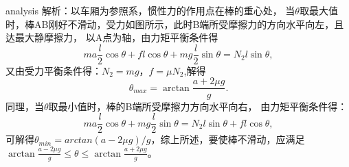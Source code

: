 \begin{example}
	
	\begin{taggedblock}{analysis}
		解析：以车厢为参照系，惯性力的作用点在棒的重心处，
		当$ \theta $取最大值时，棒AB刚好不滑动，受力如图所示，此时B端所受摩擦力的方向水平向左，且达最大静摩擦力，
		以A点为轴，由力矩平衡条件得
		\[
		ma\frac{l}{2}\cos\theta+fl\cos\theta+mg\frac{l}{2}\sin\theta = N_2l\sin\theta,
		\]
		又由受力平衡条件得：$N_2=mg$，$		f=\mu N_2$,解得
		\[
		\theta_{max} = \arctan\frac{a+2\mu g}{g}.
		\]
		同理，当$ \theta $取最小值时，棒的B端所受摩擦力方向水平向右，
		由力矩平衡条件得：
		\[
			ma\frac{l}{2}\cos\theta+mg\frac{l}{2}\sin\theta = N_2l\sin\theta+fl\cos\theta,
		\]
	可解得$ θ_{min}=arctan⁡(a-2μg)/g $，综上所述，要使棒不滑动，应满足$ \arctan\frac{a-2\mu g}{g}\le \theta \le \arctan\frac{a+2\mu g}{g} $。
		
		
	\end{taggedblock}
\end{example}


